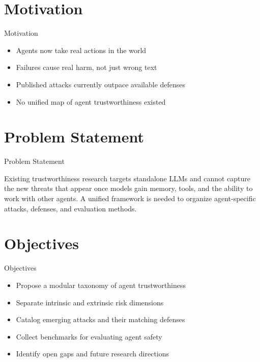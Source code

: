\documentclass[10pt]{beamer}
\begin{document}
\section{Motivation}
\begin{frame}{Motivation}
\begin{itemize}
  \item Agents now take real actions in the world
  \item Failures cause real harm, not just wrong text
  \item Published attacks currently outpace available defenses
  \item No unified map of agent trustworthiness existed
\end{itemize}
\end{frame}

\section{Problem Statement}
\begin{frame}{Problem Statement}
  \begin{block}{}
  Existing trustworthiness research targets standalone LLMs and cannot capture the new threats that appear once models gain memory, tools, and the ability to work with other agents. A unified framework is needed to organize agent-specific attacks, defenses, and evaluation methods.
  \end{block}
\end{frame}

\section{Objectives}
\begin{frame}{Objectives}
\begin{itemize}
  \item Propose a modular taxonomy of agent trustworthiness
  \item Separate intrinsic and extrinsic risk dimensions
  \item Catalog emerging attacks and their matching defenses
  \item Collect benchmarks for evaluating agent safety
  \item Identify open gaps and future research directions
\end{itemize}
\end{frame}
\end{document}
